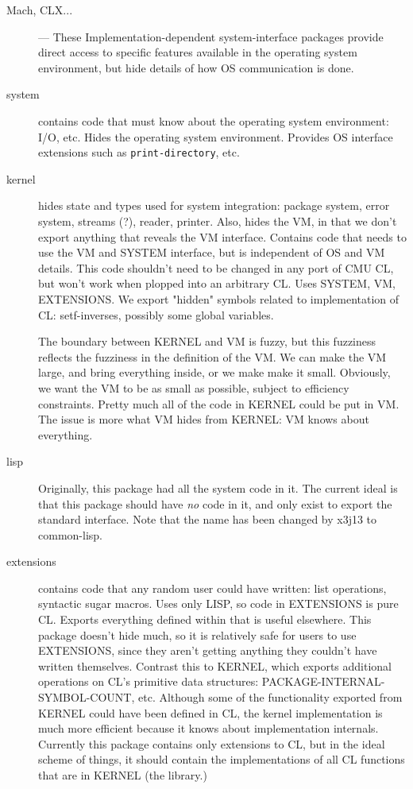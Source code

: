 \begin{description}
\item[Mach, CLX...] --- These Implementation-dependent system-interface
packages provide direct access to specific features available in the operating
system environment, but hide details of how OS communication is done.

\item[system] contains code that must know about the operating system
environment: I/O, etc.  Hides the operating system environment.  Provides OS
interface extensions such as {\tt print-directory}, etc.

\item[kernel] hides state and types used for system integration: package
system, error system, streams (?), reader, printer.  Also, hides the VM, in
that we don't export anything that reveals the VM interface.  Contains code
that needs to use the VM and SYSTEM interface, but is independent of OS and VM
details.  This code shouldn't need to be changed in any port of CMU CL, but
won't work when plopped into an arbitrary CL.  Uses SYSTEM, VM, EXTENSIONS.  We
export "hidden" symbols related to implementation of CL: setf-inverses,
possibly some global variables.

The boundary between KERNEL and VM is fuzzy, but this fuzziness reflects the
fuzziness in the definition of the VM.  We can make the VM large, and bring
everything inside, or we make make it small.  Obviously, we want the VM to be
as small as possible, subject to efficiency constraints.  Pretty much all of
the code in KERNEL could be put in VM.  The issue is more what VM hides from
KERNEL: VM knows about everything.

\item[lisp]  Originally, this package had all the system code in it.  The
current ideal is that this package should have {\it no} code in it, and only
exist to export the standard interface.  Note that the name has been changed by
x3j13 to common-lisp.

\item[extensions] contains code that any random user could have written: list
operations, syntactic sugar macros.  Uses only LISP, so code in EXTENSIONS is
pure CL.  Exports everything defined within that is useful elsewhere.  This
package doesn't hide much, so it is relatively safe for users to use
EXTENSIONS, since they aren't getting anything they couldn't have written
themselves.  Contrast this to KERNEL, which exports additional operations on
CL's primitive data structures: PACKAGE-INTERNAL-SYMBOL-COUNT, etc.  Although
some of the functionality exported from KERNEL could have been defined in CL,
the kernel implementation is much more efficient because it knows about
implementation internals.  Currently this package contains only extensions to
CL, but in the ideal scheme of things, it should contain the implementations of
all CL functions that are in KERNEL (the library.)


\end{description}
